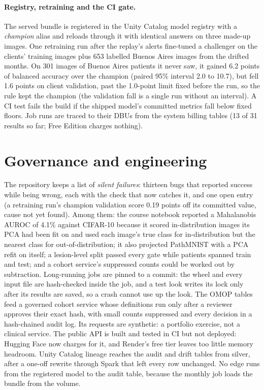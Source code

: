 \documentclass[11pt]{article}
\begin{document}
\paragraph{Registry, retraining and the CI gate.} The served bundle is registered in the Unity
Catalog model registry with a \emph{champion} alias and reloads through it with identical
answers on three made-up images. One retraining run after the replay's alerts fine-tuned a challenger on the clients' training images plus 653 labelled Buenos Aires images from the drifted months. On 301 images of Buenos Aires patients it never saw, it gained 6.2 points of balanced accuracy over the champion (paired 95\% interval 2.0 to 10.7), but fell 1.6 points on client validation, past the 1.0-point limit fixed before the run, so the rule kept the champion (the validation fall is a single run without an interval). A CI test fails the build if the shipped model's committed metrics fall below fixed
floors. Job runs are traced to their DBUs from the system billing tables (13 of 31 results so far; Free Edition
charges nothing).

\section{Governance and engineering}
The repository keeps a list of \emph{silent failures}: thirteen bugs that reported success while
being wrong, each with the check that now catches it, and one open entry (a retraining run's
champion validation score 0.19 points off its committed value, cause not yet found). Among them: the course notebook reported a
Mahalanobis AUROC of 4.1\% against CIFAR-10 because it scored in-distribution images its PCA had
been fit on and used each image's true class for in-distribution but the nearest class for
out-of-distribution; it also projected PathMNIST with a PCA refit on itself; a lesion-level split passed every gate while
patients spanned train and test; and a cohort service's suppressed counts could be worked out by
subtraction. Long-running jobs are pinned to a commit: the wheel and every input file are
hash-checked inside the job, and a test look writes its lock only after its results are saved,
so a crash cannot use up the look. The OMOP tables feed a governed cohort service whose
definitions run only after a reviewer approves their exact hash, with small counts suppressed
and every decision in a hash-chained audit log. Its requests are synthetic: a portfolio exercise,
not a clinical service. The public API is built and tested in CI but not deployed: Hugging Face now charges for it, and Render's free tier
leaves too little memory headroom. Unity Catalog lineage reaches the audit and drift
tables from silver, after a one-off rewrite through Spark that left every row unchanged. No edge
runs from the registered model to the audit table, because the monthly job loads the bundle
from the volume.
\end{document}
